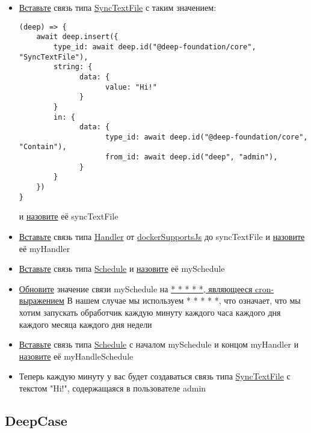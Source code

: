 \documentclass{article}
\begin{document}
\begin{itemize}
  \item \hyperlink{DeepCase.InsertLink.Description}{Вставьте} связь типа
        \hyperlink{Core.SyncTextFile.Description}{SyncTextFile} с таким
        значением:
        \begin{lstlisting}
(deep) => {
    await deep.insert({
        type_id: await deep.id("@deep-foundation/core", "SyncTextFile"),
        string: {
              data: {
                    value: "Hi!"
              }
        }
        in: {
              data: {
                    type_id: await deep.id("@deep-foundation/core", "Contain"),
                    from_id: await deep.id("deep", "admin"),
              }
        }
    })
}
    \end{lstlisting}
        и \hyperlink{FAQ.HowToSetName}{назовите} её syncTextFile
  \item \hyperlink{DeepCase.InsertLink.Description}{Вставьте} связь типа
        \hyperlink{Core.Handler.Description}{Handler} от
        \hyperlink{Core.dockerSupportsJs.Description}{dockerSupportsJs}
        до syncTextFile и \hyperlink{FAQ.HowToSetName}{назовите} её
        myHandler
  \item \hyperlink{DeepCase.InsertLink.Description}{Вставьте} связь
        типа \hyperlink{Core.Schedule.Description}{Schedule} и
        \hyperlink{FAQ.HowToSetName}{назовите} её mySchedule
  \item \hyperlink{DeepCase.UpdateLink.Description}{Обновите}
        значение связи mySchedule на
        \hyperlink{Handler.Schedule.CronExpression.Description}{* * * * *,
          являющееся
          cron-выражением}
        В нашем случае мы используем * * * * *, что означает, что мы хотим
        запускать обработчик каждую минуту каждого часа каждого дня каждого
        месяца
        каждого дня недели
  \item \hyperlink{DeepCase.InsertLink.Description}{Вставьте} связь
        типа \hyperlink{Core.HandleSchedule.Description}{Schedule} с
        началом mySchedule
        и концом myHandler	и \hyperlink{FAQ.HowToSetName}{назовите} её
        myHandleSchedule
  \item Теперь каждую минуту у вас будет создаваться связь типа
        \hyperlink{Core.SyncTextFile.Description}{SyncTextFile} с текстом
        "Hi!",
        содержащаяся в пользователе admin
\end{itemize}
\subsection{DeepCase}
\end{document}
